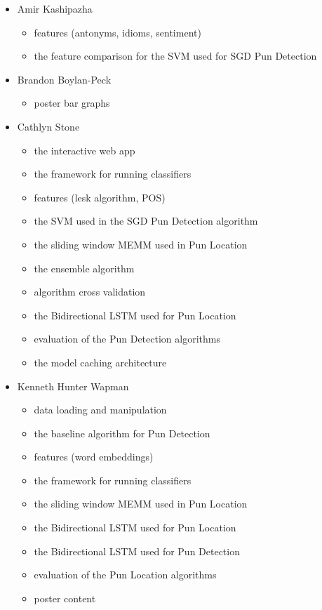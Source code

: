 \documentclass{article}
\begin{document}
\begin{itemize}

\item Amir Kashipazha
	\begin{itemize}
		\item features (antonyms, idioms, sentiment)
		\item the feature comparison for the SVM used for SGD Pun Detection
	\end{itemize}
\item Brandon Boylan-Peck
	\begin{itemize}
		\item poster bar graphs
	\end{itemize}
\item Cathlyn Stone
	\begin{itemize}
		\item the interactive web app
		\item the framework for running classifiers
		\item features (lesk algorithm, POS)
		\item the SVM used in the SGD Pun Detection algorithm
		\item the sliding window MEMM used in Pun Location
		\item the ensemble algorithm
		\item algorithm cross validation
		\item the Bidirectional LSTM used for Pun Location
		\item evaluation of the Pun Detection algorithms
		\item the model caching architecture
	\end{itemize}
\item Kenneth Hunter Wapman
	\begin{itemize}
		\item data loading and manipulation
		\item the baseline algorithm for Pun Detection
		\item features (word embeddings)
		\item the framework for running classifiers
		\item the sliding window MEMM used in Pun Location
		\item the Bidirectional LSTM used for Pun Location
		\item the Bidirectional LSTM used for Pun Detection
		\item evaluation of the Pun Location algorithms
		\item poster content

\end{itemize}
\end{itemize}
\end{document}

